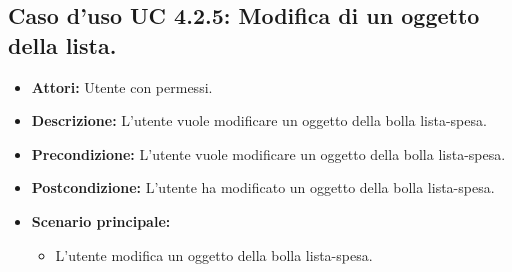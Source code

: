 \subsection{Caso d'uso UC 4.2.5: Modifica di un oggetto della lista.}
\label{Caso d'uso UC 4.2.5: Modifica di un oggetto della lista.}

\FloatBarrier
\begin{itemize}
\item \textbf{Attori:} Utente con permessi.
\item \textbf{Descrizione:} L'utente vuole modificare un oggetto della bolla lista-spesa.
\item \textbf{Precondizione:} L'utente vuole modificare un oggetto della bolla lista-spesa. 
\item \textbf{Postcondizione:} L'utente ha modificato un oggetto della bolla lista-spesa.
\item \textbf{Scenario principale:}
	\begin{itemize}
	\item{L'utente modifica un oggetto della bolla lista-spesa.}
	\end{itemize}
\end{itemize}